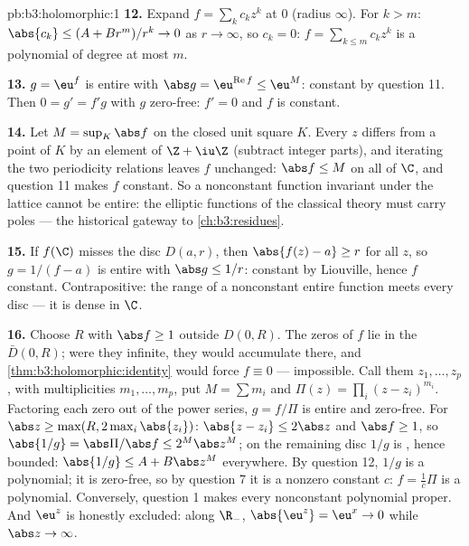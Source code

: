 \begin{solution}{pb:b3:holomorphic:1}
\textbf{12.} Expand $f = \sum_kc_kz^k$ at $0$ (radius
$\infty$). For $k > m$: $\abs{c_k} \leq (A + Br^m)/r^k \to
0$ as $r \to \infty$, so $c_k = 0$: $f =
\sum_{k\leq m}c_kz^k$ is a polynomial of degree at most $m$.

\textbf{13.} $g = \eu^f$ is entire with $\abs g =
\eu^{\operatorname{Re}f} \leq \eu^M$: constant by question
11. Then $0 = g' = f'g$ with $g$ zero-free: $f' = 0$ and $f$
is constant.

\textbf{14.} Let $M = \sup_K\abs f$ on the  closed
unit square $K$. Every $z$ differs from a point of $K$ by an
element of $\Z + \iu\Z$ (subtract integer parts), and
iterating the two periodicity relations leaves $f$
unchanged: $\abs f \leq M$ on all of $\C$, and question 11
makes $f$ constant. So a nonconstant function invariant
under the lattice cannot be entire: the elliptic functions
of the classical theory must carry poles --- the historical
gateway to \cref{ch:b3:residues}.

\textbf{15.} If $f(\C)$ misses the disc $D(a, r)$, then
$\abs{f(z) - a} \geq r$ for all $z$, so $g = 1/(f - a)$ is
entire with $\abs g \leq 1/r$: constant by Liouville, hence
$f$ constant. Contrapositive: the range of a nonconstant
entire function meets every disc --- it is dense in $\C$.

\textbf{16.} Choose $R$ with $\abs f \geq 1$ outside
$D(0, R)$. The zeros of $f$ lie in the 
$\bar D(0, R)$; were they infinite, they would accumulate
there, and \cref{thm:b3:holomorphic:identity} would force $f
\equiv 0$ --- impossible. Call them $z_1, \dots, z_p$, with
multiplicities $m_1, \dots, m_p$, put $M = \sum m_i$ and
$\Pi(z) = \prod_i(z - z_i)^{m_i}$. Factoring each zero out
of the power series, $g = f/\Pi$ is entire and zero-free.
For $\abs z \geq \max(R, 2\max_i\abs{z_i})$: $\abs{z - z_i}
\leq 2\abs z$ and $\abs f \geq 1$, so $\abs{1/g} =
\abs\Pi/\abs f \leq 2^M\abs z^M$; on the remaining 
disc $1/g$ is , hence bounded: $\abs{1/g} \leq A +
B\abs z^M$ everywhere. By question 12, $1/g$ is a
polynomial; it is zero-free, so by question 7 it is a
nonzero constant $c$: $f = \frac1c\Pi$ is a polynomial.
Conversely, question 1 makes every nonconstant polynomial
proper. And $\eu^z$ is honestly excluded: along $\R_-$,
$\abs{\eu^z} = \eu^x \to 0$ while $\abs z \to \infty$.


\end{solution}
